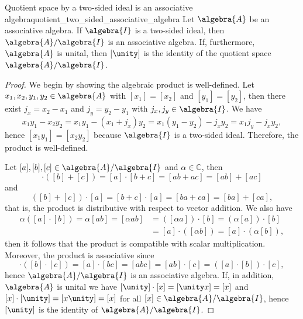 \begin{lemma}{Quotient space by a two-sided ideal is an associative algebra}{quotient_two_sided_associative_algebra}
    Let \(\algebra{A}\) be an associative algebra. If \(\algebra{I}\) is a two-sided ideal, then \(\algebra{A}/\algebra{I}\) is an associative algebra. If, furthermore, \(\algebra{A}\) is unital, then \([\unity]\) is the identity of the quotient space \(\algebra{A}/\algebra{I}\).
\end{lemma}
\begin{proof}
    We begin by showing the algebraic product is well-defined. Let \(x_1, x_2, y_1, y_2 \in \algebra{A}\) with \([x_1] = [x_2]\) and \([y_1] = [y_2]\), then there exist \(j_x = x_2 - x_1\) and \(j_y = y_2 - y_1\) with \(j_x, j_y \in \algebra{I}\). We have
    \begin{equation*}
        x_1y_1 - x_2 y_2 = x_1 y_1 - (x_1 + j_x) y_2 = x_1 (y_1 - y_2) - j_x y_2 = x_1 j_y - j_x y_2,
    \end{equation*}
    hence \([x_1 y_1] = [x_2 y_2]\) because \(\algebra{I}\) is a two-sided ideal. Therefore, the product is well-defined.

    Let \([a], [b], [c] \in \algebra{A}/\algebra{I}\) and \(\alpha \in \mathbb{C}\), then
    \begin{equation*}
        [a] \cdot ([b]+[c]) = [a]\cdot[b+c] = [ab + ac] = [ab] + [ac]
    \end{equation*}
    and
    \begin{equation*}
        ([b]+[c])\cdot[a] = [b+c]\cdot[a] = [ba + ca] = [ba] + [ca],
    \end{equation*}
    that is, the product is distributive with respect to vector addition. We also have
    \begin{align*}
        \alpha([a]\cdot[b]) = \alpha[ab] = [\alpha ab] &= ([\alpha a])\cdot[b] = (\alpha[a])\cdot[b]\\
                                                       &= [a]\cdot([\alpha b]) = [a]\cdot (\alpha[b]),
    \end{align*}
    then it follows that the product is compatible with scalar multiplication. Moreover, the product is associative since
    \begin{equation*}
        [a]\cdot([b]\cdot[c]) = [a]\cdot[bc]=[abc] = [ab] \cdot [c] = ([a]\cdot[b])\cdot[c],
    \end{equation*}
    hence \(\algebra{A}/\algebra{I}\) is an associative algebra. If, in addition, \(\algebra{A}\) is unital we have \([\unity]\cdot[x] = [\unity x] = [x]\) and \([x]\cdot[\unity] = [x \unity] = [x]\) for all \([x] \in \algebra{A}/\algebra{I}\), hence \([\unity]\) is the identity of \(\algebra{A}/\algebra{I}\).
\end{proof}
